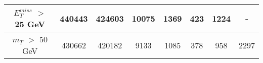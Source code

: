 \documentclass[10pt]{article}
\begin{document}
\begin{center}
\begin{table}[H]
\begin{adjustbox}{width=1\textwidth}
\begin{tabular}{cccccccc}
\multicolumn{1}{|c|}{$E_{T}^{miss}$ $>$ 25 GeV}  & \multicolumn{1}{c|}{440443} & \multicolumn{1}{c|}{424603} & \multicolumn{1}{c|}{10075} & \multicolumn{1}{c|}{1369} & \multicolumn{1}{c|}{423} & \multicolumn{1}{c|}{1224} & \multicolumn{1}{c|}{-}  \\ \hline 
\multicolumn{1}{|c|}{$m_{T}$ $>$ 50 GeV}  & \multicolumn{1}{c|}{430662} & \multicolumn{1}{c|}{420182} & \multicolumn{1}{c|}{9133} & \multicolumn{1}{c|}{1085} & \multicolumn{1}{c|}{378} & \multicolumn{1}{c|}{958} & \multicolumn{1}{c|}{2297}  \\ \hline 
\end{tabular} 										
\end{adjustbox}										
\end{table} 											
\end{center}											
\end{document}
